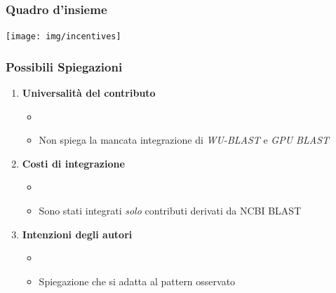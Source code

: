 \begin{frame}\frametitle{Quadro d'insieme}

\begin{center}
    \texttt{[image: img/incentives]}
\end{center}

\end{frame}

\begin{frame}\frametitle{Possibili Spiegazioni}

\begin{enumerate}[<+->]
\def\labelenumi{\arabic{enumi}.}
\itemsep1pt\parskip0pt
\item
  \textbf{Universalità del contributo}

  \begin{itemize}[<+->]
  \itemsep1pt\parskip0pt
  \item
  \item
    Non spiega la mancata integrazione di \emph{WU-BLAST} e \emph{GPU
    BLAST}
  \end{itemize}
\item
  \textbf{Costi di integrazione}

  \begin{itemize}[<+->]
  \itemsep1pt\parskip0pt
  \item
  \item
    Sono stati integrati \emph{solo} contributi derivati da NCBI BLAST
  \end{itemize}
\item
  \textbf{Intenzioni degli autori}

  \begin{itemize}[<+->]
  \itemsep1pt\parskip0pt
  \item
  \item
    Spiegazione che si adatta al pattern osservato
  \end{itemize}
\end{enumerate}

\end{frame}


